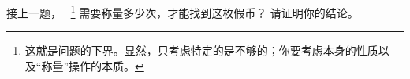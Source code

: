 
\begin{problem}[$n$ 枚硬币问题的下界]
  接上一题，
  ~\footnote{这就是问题的下界。显然，只考虑特定的是不够的；你要考虑本身的性质以及``称量''操作的本质。}
  需要称量多少次，才能找到这枚假币？
  请证明你的结论。
\end{problem}

\begin{solution}
\end{solution}
